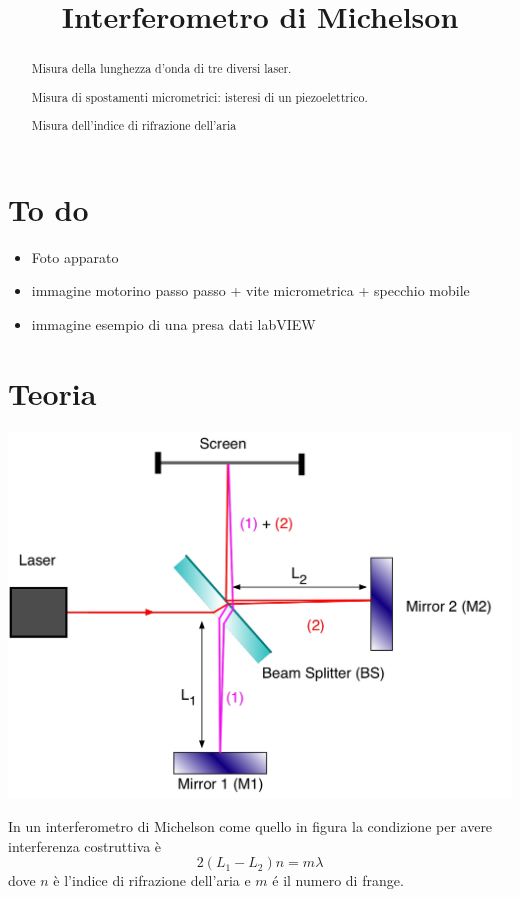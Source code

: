 \documentclass[a4paper]{article}
\begin{document}
	\title{Interferometro di Michelson}
	\maketitle
	
	\section*{To do}
	\begin{itemize}
		\item Foto apparato
		\item immagine motorino passo passo + vite micrometrica + specchio mobile
		\item immagine esempio di una presa dati labVIEW
	\end{itemize}
	
	
	\begin{abstract}
		 Misura della lunghezza d'onda di tre diversi laser.
		 
		 Misura di spostamenti micrometrici: isteresi di un piezoelettrico.
		 
		 Misura dell'indice di rifrazione dell'aria
	\end{abstract}

\section{Teoria}
\begin{center}
	\begin{minipage}[c]{.50\textwidth}
		\centering
		\includegraphics[width=1\textwidth]{michelson.png}
	\end{minipage}
	\begin{minipage}[c]{.40\textwidth}
		In un interferometro di Michelson come quello in figura la condizione per avere interferenza costruttiva è \[2(L_1 -L_2)n = m \lambda\] dove $n$ è l'indice di rifrazione dell'aria e $m$ é il numero di frange.
	\end{minipage}
\end{center}
\end{document}
